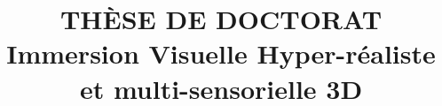 

\title{
	THÈSE DE DOCTORAT\\
	\textbf{Immersion Visuelle Hyper-réaliste et multi-sensorielle 3D}
}

\author{}
\date{}

	\makeatletter
	\makeatother 

	\makeatletter
	\renewenvironment{thebibliography}[1]
     	{\part*{\bibname}
     	 \@mkboth{\MakeUppercase\bibname}{\MakeUppercase\bibname}%
    	  \list{\@biblabel{\@arabic\c@enumiv}}%
     	      {\settowidth\labelwidth{\@biblabel{#1}}%
        	    \leftmargin\labelwidth
            	\advance\leftmargin\labelsep
            	\@openbib@code
            	\usecounter{enumiv}%
            	\let\p@enumiv\@empty
            	\renewcommand\theenumiv{\@arabic\c@enumiv}}%
      	\sloppy
      	\clubpenalty4000
      	\@clubpenalty \clubpenalty
      	\widowpenalty4000%
      	\sfcode`\.\@m}
     	{\def\@noitemerr
       	{\@latex@warning{Empty `thebibliography' environment}}%
      	\endlist}
	\makeatother




	\maketitle
	\newpage
	
	\tableofcontents	%
	\listoffigures		%
	\listoftables		%
	
				\newpage		%

	\newpage
	

	
	
%	
%	
%	

